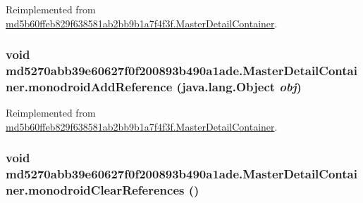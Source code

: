 Reimplemented from \hyperlink{classmd5b60ffeb829f638581ab2bb9b1a7f4f3f_1_1_master_detail_container_6c8732252530fc8d94a73921abbc50f8}{md5b60ffeb829f638581ab2bb9b1a7f4f3f.MasterDetailContainer}.\hypertarget{classmd5270abb39e60627f0f200893b490a1ade_1_1_master_detail_container_31845d67e73cb6060fb8228c0a40c8d4}{
\subsubsection[{monodroidAddReference}]{\setlength{\rightskip}{0pt plus 5cm}void md5270abb39e60627f0f200893b490a1ade.MasterDetailContainer.monodroidAddReference (java.lang.Object {\em obj})}}
\label{classmd5270abb39e60627f0f200893b490a1ade_1_1_master_detail_container_31845d67e73cb6060fb8228c0a40c8d4}




Reimplemented from \hyperlink{classmd5b60ffeb829f638581ab2bb9b1a7f4f3f_1_1_master_detail_container_5f8aaba34799a0323fa0d77618dfae96}{md5b60ffeb829f638581ab2bb9b1a7f4f3f.MasterDetailContainer}.\hypertarget{classmd5270abb39e60627f0f200893b490a1ade_1_1_master_detail_container_93a5d443fda3e43f134d2522b7230b21}{
\subsubsection[{monodroidClearReferences}]{\setlength{\rightskip}{0pt plus 5cm}void md5270abb39e60627f0f200893b490a1ade.MasterDetailContainer.monodroidClearReferences ()}}
\label{classmd5270abb39e60627f0f200893b490a1ade_1_1_master_detail_container_93a5d443fda3e43f134d2522b7230b21}




